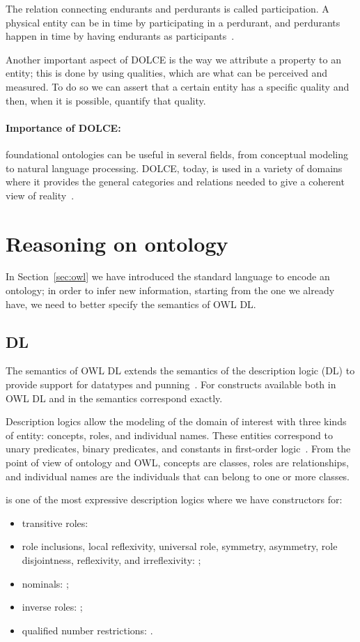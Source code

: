 The relation connecting endurants and perdurants is called participation. A physical entity can be in time by participating in a perdurant, and perdurants happen in time by having endurants as participants~\cite{borgo2022dolce}.

Another important aspect of DOLCE is the way we attribute a property to an entity; this is done by using qualities, which are what can be perceived and measured. To do so we can assert that a certain entity has a specific quality and then, when it is possible, quantify that quality. 

\paragraph{Importance of DOLCE:} foundational ontologies can be useful in several fields, from conceptual modeling to natural language processing. DOLCE, today, is used in a variety of domains where it provides the general categories and relations needed to give a coherent view of reality~\cite{borgo2022dolce}.

\section{Reasoning on ontology}
In Section~\ref{sec:owl} we have introduced the standard language to encode an ontology; in order to infer new information, starting from the one we already have, we need to better specify the semantics of OWL DL.

\subsection{ DL}
The semantics of OWL DL extends the semantics of the description logic (DL)  to provide support for datatypes and punning~\cite{w3c_2012_owl_dl}. For constructs available both in OWL DL and in  the semantics correspond exactly.

Description logics allow the modeling of the domain of interest with three kinds of entity: concepts, roles, and individual names. These entities correspond to unary predicates, binary predicates, and constants in first-order logic~\cite{krotzsch2012description}. From the point of view of ontology and OWL, concepts are classes, roles are relationships, and individual names are the individuals that can belong to one or more classes.

 is one of the most expressive description logics where we have constructors for:
\begin{itemize}
	\item transitive roles: 
	\item role inclusions, local reflexivity, universal role, symmetry, asymmetry, role disjointness, reflexivity, and irreflexivity: ;
	\item nominals: ;
	\item inverse roles: ;
	\item qualified number restrictions: .
\end{itemize}


